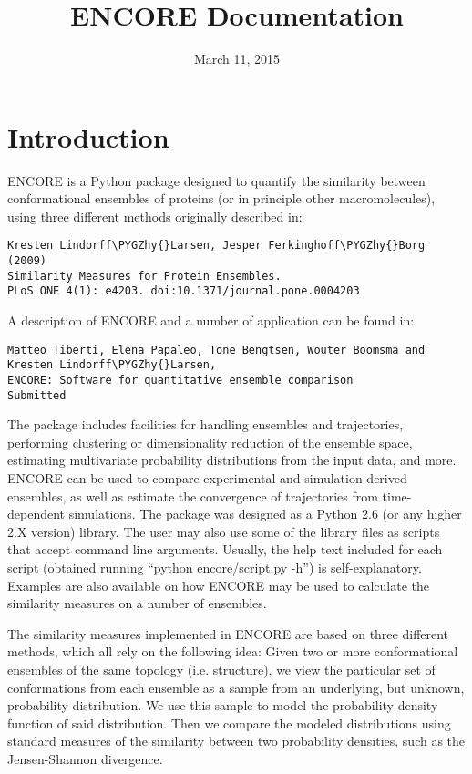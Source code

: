 \documentclass[letterpaper,10pt,english]{sphinxmanual}
\title{ENCORE Documentation}
\date{March 11, 2015}
\author{}
\def\PYGZhy{\char`\-}
\begin{document}
\maketitle
\tableofcontents
{}\label{index::doc}



\chapter{Introduction}
\label{index:introduction}\label{index:welcome-to-encore-s-documentation}
ENCORE is a Python package designed to quantify the similarity between
conformational ensembles of proteins (or in principle other
macromolecules), using three different methods originally described
in:

\begin{Verbatim}[frame=single,commandchars=\\\{\}]
Kresten Lindorff\PYGZhy{}Larsen, Jesper Ferkinghoff\PYGZhy{}Borg (2009)
Similarity Measures for Protein Ensembles.
PLoS ONE 4(1): e4203. doi:10.1371/journal.pone.0004203
\end{Verbatim}

A description of ENCORE and a number of application can be found in:

\begin{Verbatim}[frame=single,commandchars=\\\{\}]
Matteo Tiberti, Elena Papaleo, Tone Bengtsen, Wouter Boomsma and
Kresten Lindorff\PYGZhy{}Larsen,
ENCORE: Software for quantitative ensemble comparison
Submitted
\end{Verbatim}

The package includes facilities for handling ensembles and
trajectories, performing clustering or dimensionality reduction of the
ensemble space, estimating multivariate probability distributions from
the input data, and more. ENCORE can be used to compare experimental
and simulation-derived ensembles, as well as estimate the convergence
of trajectories from time-dependent simulations. The package was
designed as a Python 2.6 (or any higher 2.X version) library. The user
may also use some of the library files as scripts that accept command
line arguments. Usually, the help text included for each script
(obtained running “python encore/script.py -h”) is
self-explanatory. Examples are also available on how ENCORE may be
used to calculate the similarity measures on a number of ensembles.

The similarity measures implemented in ENCORE are based on three
different methods, which all rely on the following idea: Given two or
more conformational ensembles of the same topology (i.e. structure),
we view the particular set of conformations from each ensemble as a
sample from an underlying, but unknown, probability distribution. We
use this sample to model the probability density function of said
distribution. Then we compare the modeled distributions using standard
measures of the similarity between two probability densities, such as
the Jensen-Shannon divergence.
\end{document}
